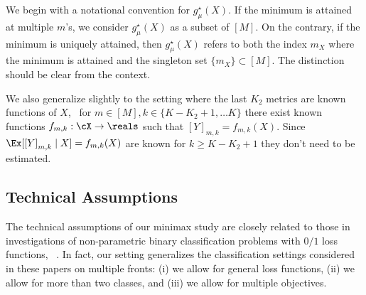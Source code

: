 We begin with a notational convention for $g_\mu^\star(X)$. If the minimum is attained at multiple $m$'s, we consider $g_\mu^\star(X)$ as a subset of $[M]$. On the contrary, if the minimum is uniquely attained, then $g_\mu^\star(X)$ refers to both the index $m_X$ where the minimum is attained and the singleton set $\{m_X\} \subset [M]$. The distinction should be clear from the context.

We also generalize slightly to the setting where the last $K_2$ metrics are known functions of $X$, \ie\ for $m \in [M], k \in \{K - K_2 +1 , \dots K\}$ there exist known functions $f_{m, k}: \cX \to \reals$ such that $[Y]_{m, k} = f_{m, k}(X)$. Since $\Ex[[Y]_{m, k}\mid X] = f_{m, k}(X)$ are known for $k \ge K - K_2 +1 $ they don't need to be estimated. 

\subsection{Technical Assumptions}






The technical assumptions of our minimax study are closely related to those in investigations of non-parametric binary classification problems with $0/1$ loss functions, \eg\  \citet{cai2019Transfer,kpotufe2018Marginal,maity2022minimax,audibert2007Fast}. In fact, our setting generalizes the classification settings considered in these papers on multiple fronts: (i) we allow for general loss functions, (ii) we allow for more than two classes, and (iii) we allow for multiple objectives. %

